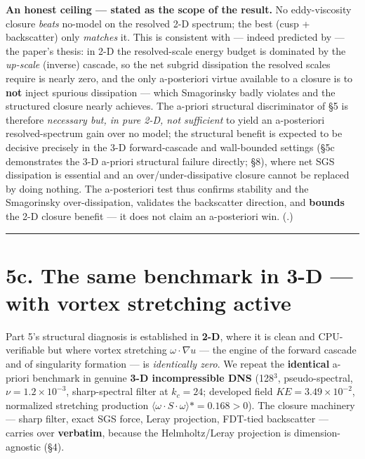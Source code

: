 \documentclass[11pt]{article}
\begin{document}
\textbf{An honest ceiling — stated as the scope of the result.} No eddy-viscosity closure \emph{beats} no-model on the resolved 2-D spectrum; the best (cusp + backscatter) only \emph{matches} it. This is consistent with — indeed predicted by — the paper's thesis: in 2-D the resolved-scale energy budget is dominated by the \emph{up-scale} (inverse) cascade, so the net subgrid dissipation the resolved scales require is nearly zero, and the only a-posteriori virtue available to a closure is to \textbf{not} inject spurious dissipation — which Smagorinsky badly violates and the structured closure nearly achieves. The a-priori structural discriminator of §5 is therefore \emph{necessary but, in pure 2-D, not sufficient} to yield an a-posteriori resolved-spectrum gain over no model; the structural benefit is expected to be decisive precisely in the 3-D forward-cascade and wall-bounded settings (§5c demonstrates the 3-D a-priori structural failure directly; §8), where net SGS dissipation is essential and an over/under-dissipative closure cannot be replaced by doing nothing. The a-posteriori test thus confirms stability and the Smagorinsky over-dissipation, validates the backscatter direction, and \textbf{bounds} the 2-D closure benefit — it does not claim an a-posteriori win. (.)


\medskip\hrule\medskip


\section*{5c. The same benchmark in 3-D — with vortex stretching active}


Part 5's structural diagnosis is established in \textbf{2-D}, where it is clean and CPU-verifiable but where vortex stretching $\omega \cdot \nabla u$ — the engine of the forward cascade and of singularity formation — is \emph{identically zero}. We repeat the \textbf{identical} a-priori benchmark in genuine \textbf{3-D incompressible DNS} (128\ensuremath{^{3}}, pseudo-spectral, $\nu =1.2\times 10^{-3}$, sharp-spectral filter at $k_{c}=24$; developed field $KE=3.49\times 10^{-2}$, normalized stretching production $\langle \omega \cdot S\cdot \omega \rangle *=0.168>0$). The closure machinery — sharp filter, exact SGS force, Leray projection, FDT-tied backscatter — carries over \textbf{verbatim}, because the Helmholtz/Leray projection is dimension-agnostic (§4).
\end{document}
